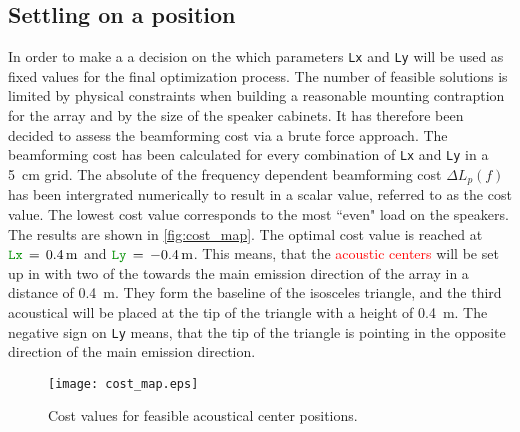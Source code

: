 \subsection{Settling on a position}\label{ssec:cost_map}
In order to make a a decision on the which parameters \textcolor{green3}{\texttt{Lx}} and \textcolor{green3}{\texttt{Ly}} will be used as fixed values for the final optimization process. The number of feasible solutions is limited by physical constraints when building a reasonable mounting contraption for the array and by the size of the speaker cabinets. It has therefore been decided to assess the beamforming cost via a brute force approach. The beamforming cost has been calculated for every combination of \textcolor{green3}{\texttt{Lx}} and \textcolor{green3}{\texttt{Ly}} in a \SI{5}{\centi\meter} grid. The absolute of the frequency dependent beamforming cost $\Delta L_{p}(f)$ has been intergrated numerically to result in a scalar value, referred to as the cost value. The lowest cost value corresponds to the most ``even" load on the speakers. The results are shown in \autoref{fig:cost_map}. The optimal cost value is reached at $\textcolor{green3}{\texttt{Lx}}\,=\,\SI{0.4}{\meter}$ and $\textcolor{green3}{\texttt{Ly}}\,=\,\SI{-0.4}{\meter}$. This means, that the \textcolor{red}{acoustic centers} will be set up in with two of the towards the main emission direction of the array in a distance of \SI{0.4}{\meter}. They form the baseline of the isosceles triangle, and the third acoustical will be placed at the tip of the triangle with a height of \SI{0.4}{\meter}. The negative sign on \textcolor{green3}{\texttt{Ly}} means, that the tip of the triangle is pointing in the opposite direction of the main emission direction.
\begin{figure}[H]
	\centering
	\texttt{[image: cost\_map.eps]}
	\caption{Cost values for feasible acoustical center positions.}
		\label{fig:cost_map}
\end{figure}

